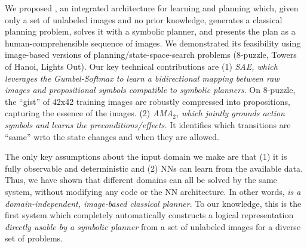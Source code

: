 \documentclass[11pt]{article}
\begin{document}
We proposed  \latentplanner, an integrated architecture for learning and planning which,
given only a set of unlabeled images and no prior knowledge, generates a classical planning problem,
solves it with a symbolic planner,
and presents the plan as a human-comprehensible sequence of images.
%
We demonstrated its feasibility using image-based versions of planning/state-space-search problems (8-puzzle, Towers of Hanoi,  Lights Out).
Our key technical contributions are
(1) \emph{SAE, which leverages the Gumbel-Softmax to learn a bidirectional mapping between raw images and propositional symbols compatible to symbolic planners}.
On 8-puzzle, the ``gist'' of  42x42 training images are robustly compressed into propositions, capturing the essence of the images.
(2) \emph{AMA$_2$, which jointly grounds action symbols and learns the preconditions/effects.}
It identifies which transitions are ``same'' wrto the state changes and when they are allowed.

The only key assumptions about the input domain we make are that
(1) it is fully observable and deterministic and (2) NNs can learn from the available data.
Thus, we have shown that different domains can all be solved by the same system,
without modifying any code or the NN architecture.
In other words, \emph{\latentplanner is a domain-independent, image-based classical planner}.
% 
To our knowledge, this is the first system which completely automatically constructs a logical representation
\emph{directly usable by a symbolic planner} from a set of unlabeled images for a diverse set of problems.


\end{document}
